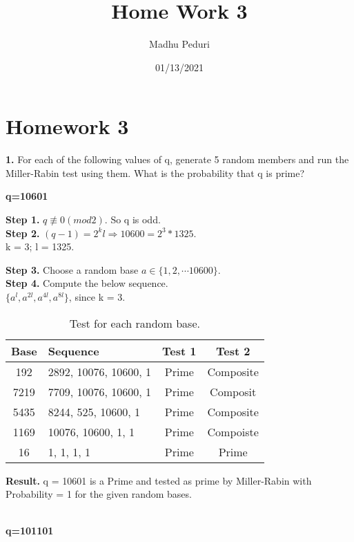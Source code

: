 \documentclass [12pt]{article}
\title{Home Work 3}
\author{Madhu Peduri}
\date{01/13/2021}
\theoremstyle{definition}
\begin{document}
\section*{Homework 3}

{\bf 1.} For each of the following values of q, generate 5 random members and run the Miller-Rabin test using them. What is the probability that q is prime?

\phantom{1em} {\bf q=10601}

\phantom{1em} {\bf Step 1.} $q \not\equiv 0 (mod 2)$. So q is odd. \\

\phantom{1em} {\bf Step 2.} $ (q - 1) = 2^{k}l  \Longrightarrow 10600 = 2^{3}*1325 $.\\
\phantom{1000em} k = 3; l = 1325.

\phantom{1em} {\bf Step 3.} Choose a random base $a \in \{1, 2, \dotsb 10600 \}$. \\

\phantom{1em} {\bf Step 4.} Compute the below sequence. \\
\phantom{1000em} $\{a^{l}, a^{2l}, a^{4l}, a^{8l}\}$, since k = 3.

\begin{table}[h!]
  \begin{center}
    \caption{Test for each random base.}
    \label{tab:Miller-Rabin}
    \begin{tabular}{c|l|c|c} %
      \textbf{Base} & \textbf{Sequence} & \textbf{Test 1} & \textbf{Test 2}\\
      \hline
      192 & 2892, 10076, 10600, 1 & Prime & Composite\\
      7219 & 7709, 10076, 10600, 1 & Prime & Composit\\
      5435 & 8244, 525, 10600, 1 & Prime & Composite\\
      1169 & 10076, 10600, 1, 1 & Prime & Compoiste\\
      16 & 1, 1, 1, 1 & Prime & Prime\\
    \end{tabular}
  \end{center}
\end{table}

\phantom{1em} {\bf Result.} q = 10601 is a Prime and tested as prime by Miller-Rabin with Probability = 1 for the given random bases. \\\

\phantom{1em} {\bf q=101101}
\end{document}
